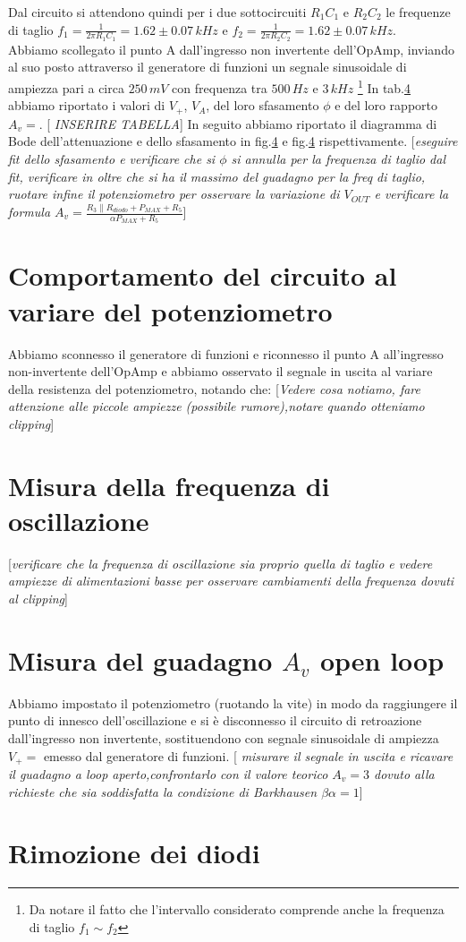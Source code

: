 \documentclass[10pt,a4paper]{article}
\newcommand{\rem}[1]{[\emph{#1}]}
\begin{document}
Dal circuito si attendono quindi per i due sottocircuiti $R_1 C_1$ e $R_2 C_2$ le frequenze di taglio $f_1=\frac{1}{2 \pi R_1C_1} = 1.62 \pm 0.07 \, kHz $ e $f_2=\frac{1}{2 \pi R_2C_2} = 1.62 \pm 0.07 \, kHz$.\\

Abbiamo scollegato il punto A dall'ingresso non invertente dell'OpAmp, inviando al suo posto attraverso il generatore di funzioni un segnale sinusoidale di ampiezza pari a circa $250\,mV$ con frequenza tra $500\,Hz$ e $3\,kHz$ \footnote{Da notare il fatto che l'intervallo considerato comprende anche la frequenza di taglio $f_1 \sim f_2$}
In tab.\ref{} abbiamo riportato i valori di $V_+$, $V_A$, del loro sfasamento $\phi$ e del loro rapporto $A_v=$. 
\rem{ INSERIRE TABELLA}
In seguito abbiamo riportato il diagramma di Bode dell'attenuazione e dello sfasamento in fig.\ref{} e fig.\ref{} rispettivamente.
\rem{eseguire fit dello sfasamento e verificare che si  $\phi$ si annulla per la frequenza di taglio dal fit, verificare in oltre che si ha il massimo del guadagno per la freq di taglio, ruotare infine il potenziometro per osservare la variazione di  $V_{OUT}$  e verificare la formula $A_v=\frac{R_3\parallel R_{diodo}+P_{MAX}+R_5}{\alpha P_{MAX}+R_5}$}


\section{Comportamento del circuito al variare del potenziometro}
Abbiamo sconnesso il generatore di funzioni e riconnesso il punto A all'ingresso non-invertente dell'OpAmp e abbiamo osservato il segnale in uscita al variare della resistenza del potenziometro, notando che:
\rem{Vedere cosa notiamo, fare attenzione alle piccole ampiezze (possibile rumore),notare quando otteniamo clipping}
\section{Misura della frequenza di oscillazione}
\rem{verificare che la frequenza di oscillazione sia proprio quella di taglio e vedere  ampiezze di alimentazioni basse per osservare  cambiamenti della frequenza dovuti al clipping}
\section{Misura del guadagno $A_v$ open loop}
Abbiamo impostato il potenziometro (ruotando la vite) in modo da raggiungere il punto di innesco dell’oscillazione e si è disconnesso il circuito di retroazione dall’ingresso non invertente, sostituendono con segnale sinusoidale di ampiezza  $V_+=$ emesso dal generatore di funzioni.
\rem{ misurare il segnale in uscita e ricavare il guadagno a loop aperto,confrontarlo con il valore teorico $A_v=3$ dovuto alla richieste che sia soddisfatta la condizione di Barkhausen $\beta \alpha =1$}
\section{Rimozione dei diodi}
\end{document}
